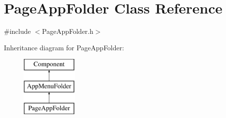 \hypertarget{classPageAppFolder}{}\section{Page\+App\+Folder Class Reference}
\label{classPageAppFolder}


{\ttfamily \#include $<$Page\+App\+Folder.\+h$>$}

Inheritance diagram for Page\+App\+Folder\+:\begin{figure}[H]
\begin{center}
\leavevmode
\includegraphics[height=3.000000cm]{classPageAppFolder}
\end{center}
\end{figure}
